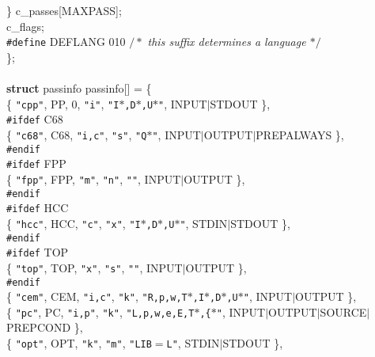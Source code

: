 \begin{flushleft}
\hspace*{3\indentation}\} c\_passes[MAXPASS];\mbox{}\\
\hspace*{3\indentation}{\bf int}  c\_flags;\mbox{}\\
{\tt \#define} DEFLANG      010   {$/\ast$\it{} this suffix determines a language $\ast/$}\mbox{}\\
\};\mbox{}\\
\mbox{}\\
{\bf struct} passinfo passinfo[] = \{\mbox{}\\
\hspace*{3\indentation}\{ {\tt"cpp"}, PP, 0, {\tt"i"}, {\tt"I$\ast$,D$\ast$,U$\ast$"}, INPUT$\mid$STDOUT \},\mbox{}\\
{\tt \#ifdef} C68\mbox{}\\
\hspace*{3\indentation}\{ {\tt"c68"}, C68, {\tt"i,c"}, {\tt"s"}, {\tt"Q$\ast$"}, INPUT$\mid$OUTPUT$\mid$PREPALWAYS \},\mbox{}\\
{\tt \#endif}\mbox{}\\
{\tt \#ifdef} FPP\mbox{}\\
\hspace*{3\indentation}\{ {\tt"fpp"}, FPP, {\tt"m"},   {\tt"n"}, {\tt""}, INPUT$\mid$OUTPUT \},\mbox{}\\
{\tt \#endif}\mbox{}\\
{\tt \#ifdef} HCC\mbox{}\\
\hspace*{3\indentation}\{ {\tt"hcc"}, HCC, {\tt"c"}, {\tt"x"}, {\tt"I$\ast$,D$\ast$,U$\ast$"}, STDIN$\mid$STDOUT \},\mbox{}\\
{\tt \#endif}\mbox{}\\
{\tt \#ifdef} TOP\mbox{}\\
\hspace*{3\indentation}\{ {\tt"top"}, TOP, {\tt"x"}, {\tt"s"}, {\tt""}, INPUT$\mid$OUTPUT \},\mbox{}\\
{\tt \#endif}\mbox{}\\
\hspace*{3\indentation}\{ {\tt"cem"}, CEM, {\tt"i,c"}, {\tt"k"}, {\tt"R,p,w,T$\ast$,I$\ast$,D$\ast$,U$\ast$"}, INPUT$\mid$OUTPUT \},\mbox{}\\
\hspace*{3\indentation}\{ {\tt"pc"}, PC, {\tt"i,p"}, {\tt"k"}, {\tt"L,p,w,e,E,T$\ast$,\{$\ast$"}, INPUT$\mid$OUTPUT$\mid$SOURCE$\mid$PREPCOND \},\mbox{}\\
\hspace*{3\indentation}\{ {\tt"opt"}, OPT, {\tt"k"}, {\tt"m"}, {\tt"LIB$=$L"}, STDIN$\mid$STDOUT \},\mbox{}\\

\end{flushleft}
